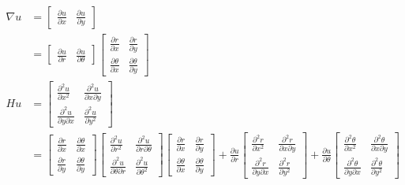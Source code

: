 \documentclass[11pt,letterpaper,draft]{report}
\theoremstyle{plain}
\theoremstyle{definition}
\theoremstyle{remark}
\newcommand\<{\langle}
\renewcommand\>{\rangle}
\begin{document}
\begin{align*}
  \nabla u
  &=
  \begin{bmatrix}
    \frac{\partial u}{\partial x} &
    \frac{\partial u}{\partial y}
  \end{bmatrix} \\
  &=
  \begin{bmatrix}
    \frac{\partial u}{\partial r} &
    \frac{\partial u}{\partial \theta}
  \end{bmatrix}
  \begin{bmatrix}
    \frac{\partial r}{\partial x} &
    \frac{\partial r}{\partial y} \\[1mm]
    \frac{\partial \theta}{\partial x} &
    \frac{\partial \theta}{\partial y}
  \end{bmatrix}
  \\
  Hu
  &=
  \begin{bmatrix}
    \frac{\partial ^{2}u}{\partial x^{2}} & 
    \frac{\partial ^{2}u}{\partial x\partial y} \\[1mm]
    \frac{\partial ^{2}u}{\partial y\partial x} & 
    \frac{\partial ^{2}u}{\partial y^{2}}
  \end{bmatrix} \\
  &=
  \begin{bmatrix}
    \frac{\partial r}{\partial x} &
    \frac{\partial \theta}{\partial x} \\[1mm]
    \frac{\partial r}{\partial y} &
    \frac{\partial \theta}{\partial y}
  \end{bmatrix}
  \begin{bmatrix}
    \frac{\partial ^{2}u}{\partial r^{2}} & 
    \frac{\partial ^{2}u}{\partial r\partial\theta} \\[1mm]
    \frac{\partial ^{2}u}{\partial \theta\partial r} & 
    \frac{\partial ^{2}u}{\partial \theta^{2}}
  \end{bmatrix}
  \begin{bmatrix}
    \frac{\partial r}{\partial x} &
    \frac{\partial r}{\partial y} \\[1mm]
    \frac{\partial \theta}{\partial x} &
    \frac{\partial \theta}{\partial y}
  \end{bmatrix}
  +
  \frac{\partial u}{\partial r}
  \begin{bmatrix}
    \frac{\partial ^{2}r}{\partial x^{2}} & 
    \frac{\partial ^{2}r}{\partial x\partial y} \\[1mm]
    \frac{\partial ^{2}r}{\partial y\partial x} & 
    \frac{\partial ^{2}r}{\partial y^{2}}
  \end{bmatrix}
  +
  \frac{\partial u}{\partial \theta}
  \begin{bmatrix}
    \frac{\partial ^{2}\theta}{\partial x^{2}} & 
    \frac{\partial ^{2}\theta}{\partial x\partial y} \\[1mm]
    \frac{\partial ^{2}\theta}{\partial y\partial x} & 
    \frac{\partial ^{2}\theta}{\partial y^{2}}
  \end{bmatrix}
\end{align*}
\end{document}
